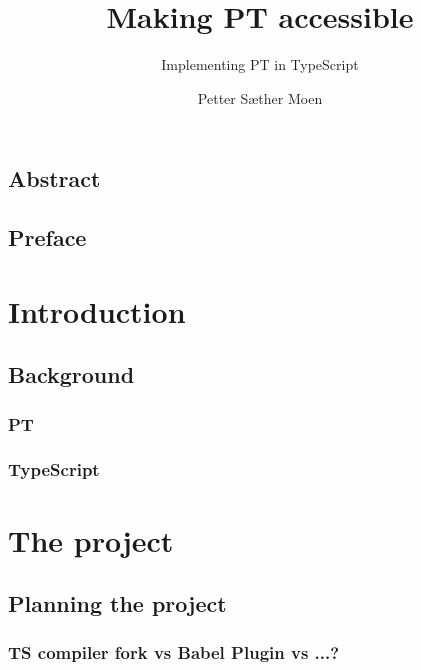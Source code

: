 \documentclass[UKenglish]{ifimaster}  %
\title{Making PT accessible}        %
\subtitle{Implementing PT in TypeScript}         %
\author{Petter Sæther Moen}                      %
\begin{document}
\duoforside[dept={Department of Informatics},   %
  program={Informatics: Programming and System Architecture},  %
  long]                                        %

\frontmatter{}
\chapter*{Abstract}                   %

\tableofcontents{}
\listoffigures{}
\listoftables{}

\chapter*{Preface}                    %

\mainmatter{}
\part{Introduction}                   %

\chapter{Background}                  %

\section{PT}

\section{TypeScript}

\part{The project}                    %

\chapter{Planning the project}        %

\section{TS compiler fork vs Babel Plugin vs ...?}
\end{document}
